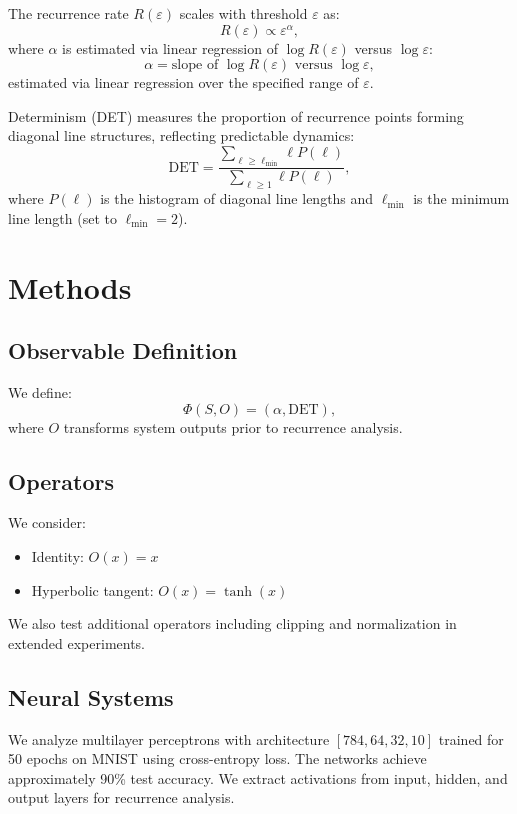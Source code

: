 \documentclass[11pt]{article}
\begin{document}
The recurrence rate $R(\varepsilon)$ scales with threshold $\varepsilon$ as:
\[
	R(\varepsilon) \propto \varepsilon^\alpha,
\]
where $\alpha$ is estimated via linear regression of $\log R(\varepsilon)$ versus $\log \varepsilon$:
\[
	\alpha = \text{slope of } \log R(\varepsilon) \text{ versus } \log \varepsilon,
\]
estimated via linear regression over the specified range of $\varepsilon$.

Determinism (DET) measures the proportion of recurrence points forming diagonal line structures, reflecting predictable dynamics:
\[
	\mathrm{DET} = \frac{\sum_{\ell \geq \ell_{\min}} \ell P(\ell)}{\sum_{\ell \geq 1} \ell P(\ell)},
\]
where $P(\ell)$ is the histogram of diagonal line lengths and $\ell_{\min}$ is the minimum line length (set to $\ell_{\min} = 2$).

\section{Methods}

\subsection{Observable Definition}

We define:
\[
	\Phi(S, O) = (\alpha, \mathrm{DET}),
\]
where $O$ transforms system outputs prior to recurrence analysis.

\subsection{Operators}

We consider:
\begin{itemize}
	\item Identity: $O(x) = x$
	\item Hyperbolic tangent: $O(x) = \tanh(x)$
\end{itemize}

We also test additional operators including clipping and normalization in extended experiments.

\subsection{Neural Systems}

We analyze multilayer perceptrons with architecture $[784, 64, 32, 10]$ trained for 50 epochs on MNIST using cross-entropy loss. The networks achieve approximately 90\% test accuracy. We extract activations from input, hidden, and output layers for recurrence analysis.
\end{document}
